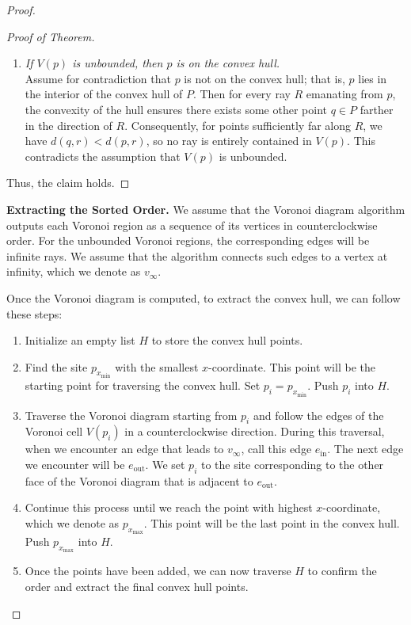 \documentclass[12pt]{article}
\begin{document}
\begin{proof}
\begin{proof}[Proof of Theorem]
\begin{enumerate}[label=\textbf{(\arabic*)}]
    \item \emph{If \(V(p)\) is unbounded, then \(p\) is on the convex hull.}\\[1mm]
    Assume for contradiction that \(p\) is not on the convex hull; that is, \(p\) lies in the interior of the convex hull of \(P\). Then for every ray \(R\) emanating from \(p\), the convexity of the hull ensures there exists some other point \(q \in P\) farther in the direction of \(R\). Consequently, for points sufficiently far along \(R\), we have \(d(q,r) < d(p,r)\), so no ray is entirely contained in \(V(p)\). This contradicts the assumption that \(V(p)\) is unbounded.
\end{enumerate}
Thus, the claim holds.
\end{proof}

\medskip
\noindent\textbf{Extracting the Sorted Order.}  
We assume that the Voronoi diagram algorithm outputs each Voronoi region as a sequence of its vertices in counterclockwise order. For the unbounded Voronoi regions, the corresponding edges will be infinite rays. We assume that the algorithm connects such edges to a vertex at infinity, which we denote as \(v_{\infty}\). 

Once the Voronoi diagram is computed, to extract the convex hull, we can follow these steps:
\begin{enumerate}[label=\arabic*.]
    \item Initialize an empty list \(H\) to store the convex hull points.
    \item Find the site \(p_{x_{\text{min}}}\) with the smallest \(x\)-coordinate. This point will be the starting point for traversing the convex hull. Set \(p_i = p_{x_{\text{min}}}\). Push \(p_i\) into \(H\).
    \item Traverse the Voronoi diagram starting from \(p_i\) and follow the edges of the Voronoi cell \(V(p_i)\) in a counterclockwise direction. During this traversal, when we encounter an edge that leads to \(v_{\infty}\), call this edge \(e_{\text{in}}\). The next edge we encounter will be \(e_{\text{out}}\). We set \(p_i\) to the site corresponding to the other face of the Voronoi diagram that is adjacent to \(e_{\text{out}}\).
    \item Continue this process until we reach the point with highest \(x\)-coordinate, which we denote as \(p_{x_{\text{max}}}\). This point will be the last point in the convex hull. Push \(p_{x_{\text{max}}}\) into \(H\).
    \item Once the points have been added, we can now traverse \(H\) to confirm the order and extract the final convex hull points.
\end{enumerate}


\end{proof}
\end{document}
